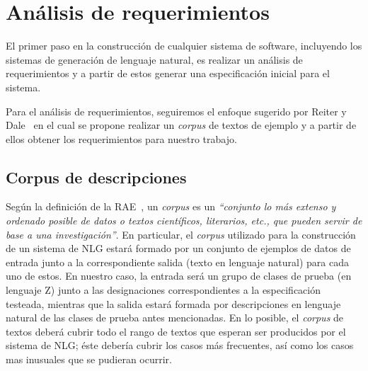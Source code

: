 \chapter{Análisis de requerimientos}
\label{cap:corpus}

El primer paso en la construcción de cualquier sistema de software, incluyendo los sistemas de generación de lenguaje natural, es realizar un análisis de requerimientos y a partir de estos generar una especificación inicial para el sistema. 

Para el análisis de requerimientos, seguiremos el enfoque sugerido por Reiter y Dale~\cite{reiter_dale} en el cual se propone realizar un \emph{corpus} de textos de ejemplo y a partir de ellos obtener los requerimientos para nuestro trabajo.

\section{Corpus de descripciones}                 

Según la definición de la RAE~\cite{dicrae}, un \emph{corpus} es un \emph{``conjunto lo más extenso y ordenado posible de datos o textos científicos, literarios, etc., que pueden servir de base a una investigación''}. En particular, el \emph{corpus} utilizado para la construcción de un sistema de NLG estará formado por un conjunto de ejemplos de datos de entrada junto a la correspondiente salida (texto en lenguaje natural) para cada uno de estos. En nuestro caso, la entrada será un grupo de clases de prueba (en lenguaje Z) junto a las designaciones correspondientes a la especificación testeada, mientras que la salida estará formada por descripciones en lenguaje natural de las clases de prueba antes mencionadas. En lo posible, el \emph{corpus} de textos deberá cubrir todo el rango de textos que esperan ser producidos por el sistema de NLG; éste debería cubrir los casos más frecuentes, así como los casos mas inusuales que se pudieran ocurrir.


